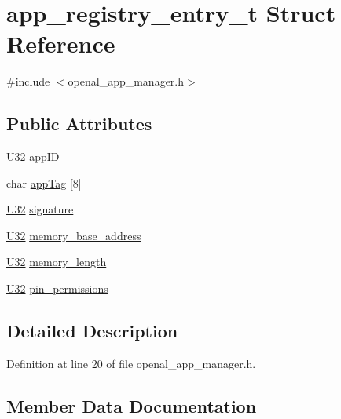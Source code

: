 \hypertarget{structapp__registry__entry__t}{}\section{app\+\_\+registry\+\_\+entry\+\_\+t Struct Reference}
\label{structapp__registry__entry__t}


{\ttfamily \#include $<$openal\+\_\+app\+\_\+manager.\+h$>$}

\subsection*{Public Attributes}
\begin{DoxyCompactItemize}
\item 
\hyperlink{openal__internal__common_8h_ac3df7cf3c8cb172a588adec881447d68}{U32} \hyperlink{structapp__registry__entry__t_a673e1ebdc2c73802850a128772754698}{app\+ID}
\item 
char \hyperlink{structapp__registry__entry__t_a8b940ede18d11ecd6e5b6c139b6ca4a0}{app\+Tag} \mbox{[}8\mbox{]}
\item 
\hyperlink{openal__internal__common_8h_ac3df7cf3c8cb172a588adec881447d68}{U32} \hyperlink{structapp__registry__entry__t_abecd42cb47026b58e244924b703a2aae}{signature}
\item 
\hyperlink{openal__internal__common_8h_ac3df7cf3c8cb172a588adec881447d68}{U32} \hyperlink{structapp__registry__entry__t_ad1d4bfecce4d3a2ed7b004f3e72bfb12}{memory\+\_\+base\+\_\+address}
\item 
\hyperlink{openal__internal__common_8h_ac3df7cf3c8cb172a588adec881447d68}{U32} \hyperlink{structapp__registry__entry__t_a395de2eff78c8ee5bd2fdd0569b9b07b}{memory\+\_\+length}
\item 
\hyperlink{openal__internal__common_8h_ac3df7cf3c8cb172a588adec881447d68}{U32} \hyperlink{structapp__registry__entry__t_a6e2d150670335817afab43fff811d2f1}{pin\+\_\+permissions}
\end{DoxyCompactItemize}


\subsection{Detailed Description}


Definition at line 20 of file openal\+\_\+app\+\_\+manager.\+h.



\subsection{Member Data Documentation}
